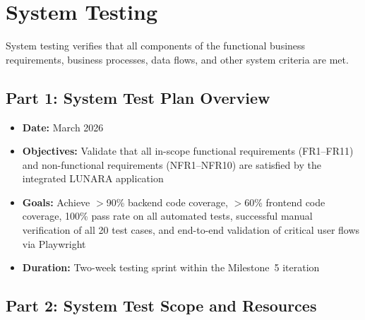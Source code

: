 \documentclass[12pt,letterpaper]{article}
\begin{document}
\section{System Testing}

System testing verifies that all components of the functional business requirements, business processes, data flows, and other system criteria are met.

\subsection{Part 1: System Test Plan Overview}

\begin{itemize}
  \item \textbf{Date:} March 2026
  \item \textbf{Objectives:} Validate that all in-scope functional requirements (FR1--FR11) and non-functional requirements (NFR1--NFR10) are satisfied by the integrated LUNARA application
  \item \textbf{Goals:} Achieve $>$90\% backend code coverage, $>$60\% frontend code coverage, 100\% pass rate on all automated tests, successful manual verification of all 20 test cases, and end-to-end validation of critical user flows via Playwright
  \item \textbf{Duration:} Two-week testing sprint within the Milestone~5 iteration
\end{itemize}

\subsection{Part 2: System Test Scope and Resources}
\end{document}

